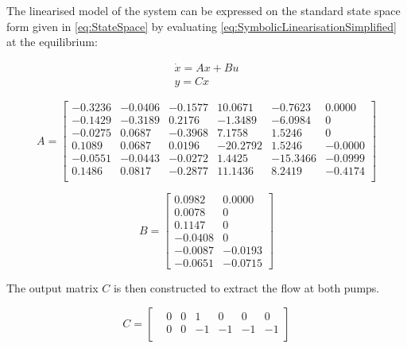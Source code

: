 The linearised model of the system can be expressed on the standard state space form given in \cref{eq:StateSpace} by evaluating \cref{eq:SymbolicLinearisationSimplified} at the equilibrium:

\begin{equation}\label{eq:StateSpace}
	\begin{split}
	\dot{x} = Ax + Bu \\
	y = Cx
	\end{split}
\end{equation}

\begin{equation}
	A = \begin{bmatrix}
		-0.3236 & -0.0406 & -0.1577 & 10.0671 & -0.7623 & 0.0000\\
		-0.1429 & -0.3189 & 0.2176 & -1.3489 & -6.0984  & 0\\
		-0.0275 & 0.0687 & -0.3968 & 7.1758 & 1.5246 & 0\\
		0.1089 & 0.0687 & 0.0196 & -20.2792 & 1.5246 & -0.0000\\
		-0.0551 & -0.0443 & -0.0272 & 1.4425 & -15.3466 &   -0.0999\\
		0.1486 & 0.0817 & -0.2877 & 11.1436 & 8.2419 & -0.4174\\
	\end{bmatrix}
\end{equation}

\begin{equation}
	B = \begin{bmatrix}
		0.0982 & 0.0000\\
		0.0078 & 0 \\
		0.1147 & 0 \\
		-0.0408 & 0 \\
		-0.0087 & -0.0193\\
		-0.0651 & -0.0715
	\end{bmatrix}
\end{equation}

The output matrix $ C $ is then constructed to extract the flow at both pumps. 

\begin{equation}
C =	\begin{bmatrix}
	&0&0&1&0&0&0\\
	&0&0&-1&-1&-1&-1\\	
\end{bmatrix} 
\end{equation}

